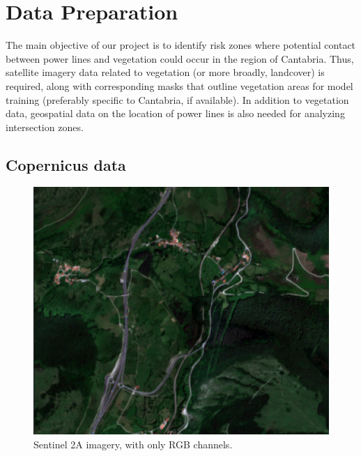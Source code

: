  
\chapter{Data Preparation}
The main objective of our project is to identify risk zones where potential contact between power lines and vegetation could occur in the region of Cantabria. Thus, satellite imagery data related to vegetation (or more broadly, landcover) is required, along with corresponding masks that outline vegetation areas for model training (preferably specific to Cantabria, if available). In addition to vegetation data, geospatial data on the location of power lines is also needed for analyzing intersection zones. 
\newpage
\section{Copernicus data}
\begin{figure}[H]
 \centering
 \includegraphics[scale=0.8]{IMAGENES/IMG10-sentinel2.png}
 \captionsetup{font=large}
 \caption {Sentinel 2A imagery, with only RGB channels.}
\end{figure}

